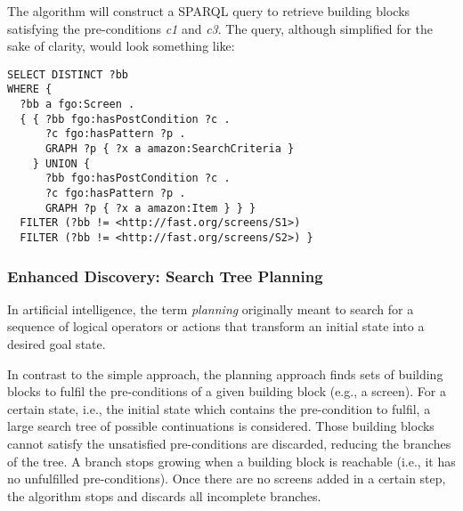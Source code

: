 The algorithm will construct a SPARQL query to retrieve building blocks satisfying the pre-conditions \emph{c1} and \emph{c3}. 
The query, although simplified for the sake of clarity, would look something like:

\begin{lstlisting}
SELECT DISTINCT ?bb 
WHERE { 
  ?bb a fgo:Screen . 
  { { ?bb fgo:hasPostCondition ?c .
      ?c fgo:hasPattern ?p .
      GRAPH ?p { ?x a amazon:SearchCriteria } 
    } UNION {
      ?bb fgo:hasPostCondition ?c .
      ?c fgo:hasPattern ?p .
      GRAPH ?p { ?x a amazon:Item } } }
  FILTER (?bb != <http://fast.org/screens/S1>) 
  FILTER (?bb != <http://fast.org/screens/S2>) }
\end{lstlisting}


\subsubsection{Enhanced Discovery: Search Tree Planning}
\label{sssec:planning}

In artificial intelligence, the term \emph{planning} originally meant to search for a sequence of logical operators or actions that transform an initial state into a desired goal state.%

In contrast to the simple approach, the planning approach finds sets of building blocks to fulfil the pre-conditions of a given building block (e.g., a screen). For a certain state, i.e., the initial 
state which contains the pre-condition to fulfil, a large search tree of possible continuations is considered. Those building blocks cannot satisfy the unsatisfied pre-conditions are discarded, reducing the branches of the tree. A branch stops growing when a building block is reachable (i.e., it has no unfulfilled pre-conditions). Once there are no screens 
added in a certain step, the algorithm stops and discards all incomplete branches.

